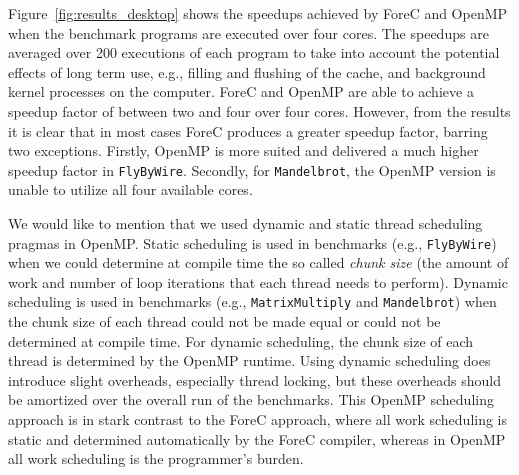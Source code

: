 Figure~\ref{fig:results_desktop} shows the speedups achieved by ForeC
and OpenMP when the benchmark programs are executed over four
cores. The speedups are averaged over 200 executions of each program to
take into account the potential effects of long term use, e.g., filling
and flushing of the cache, and background kernel processes on the computer. ForeC
and OpenMP are able to achieve a speedup factor of between two and
four over four cores. However, from the results it is clear that in most
cases ForeC produces a greater speedup factor, barring two
exceptions. Firstly, OpenMP is more suited and delivered a much higher
speedup factor in \verb$FlyByWire$. Secondly, for \verb$Mandelbrot$,
the OpenMP version is unable to utilize all four available cores.

We would like to mention that we used dynamic and static thread
scheduling pragmas in OpenMP. Static scheduling is used in benchmarks
(e.g., \verb$FlyByWire$) when we could determine at compile time the so 
called \emph{chunk size} (the amount of work and number of loop iterations 
that each thread needs to perform). Dynamic scheduling is used in benchmarks 
(e.g., \verb$MatrixMultiply$ and \verb$Mandelbrot$) when the chunk size of 
each thread could not be made equal or could not be determined at compile 
time. For dynamic scheduling, the chunk size of each thread is determined
by the OpenMP runtime. Using dynamic scheduling does introduce slight overheads,
especially thread locking, but these overheads should be amortized over
the overall run of the benchmarks. This OpenMP scheduling approach is in
stark contrast to the ForeC approach, where all work scheduling is
static and determined automatically by the ForeC compiler, whereas in
OpenMP all work scheduling is the programmer's burden.


